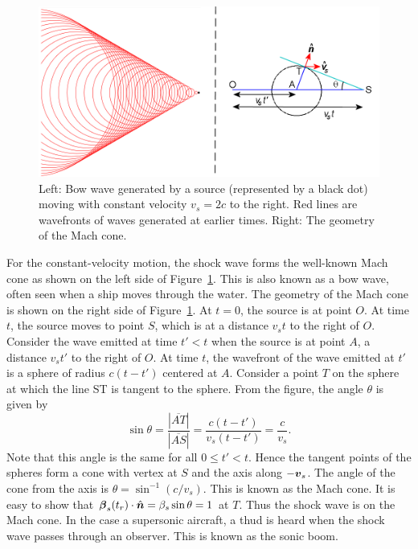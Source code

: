 \documentclass[12pt]{article}
\newcommand \beq {\begin{equation}}
\newcommand \eeq {\end{equation}}
\newcommand{\ve}[1]{\mbox{\boldmath $#1$}}
\begin{document}
\begin{figure}[h]
\includegraphics[width=14cm]{MachCone.png}
\caption{Left: Bow wave generated by a source (represented by a black dot) 
moving with constant velocity $v_s=2c$ to the right. Red lines are wavefronts 
of waves generated at earlier times. Right: The geometry of the Mach cone.}
\label{fig:bow_wave}
\end{figure}

For the constant-velocity motion, the shock wave forms the well-known Mach cone 
as shown on the left side of Figure~\ref{fig:bow_wave}. 
This is also known as a bow wave, often seen when a ship moves through 
the water. The geometry of the Mach cone is shown on the right side of Figure~\ref{fig:bow_wave}. 
At $t=0$, the source is at point $O$. At time $t$, the source moves to point $S$, which 
is at a distance $v_s t$ to the right of $O$. Consider the wave emitted at time $t'<t$ when 
the source is at point $A$, a distance $v_s t'$ to the right of $O$. At time $t$, the 
wavefront of the wave emitted at $t'$ is a sphere of radius $c(t-t')$ centered 
at $A$. Consider a point $T$ on the sphere at which the line ST is tangent to the 
sphere. From the figure, the angle $\theta$ is given by 
\beq
  \sin \theta = \frac{|\overline{AT}|}{|\overline{AS}|} = \frac{c(t-t')}{v_s(t-t')} 
 = \frac{c}{v_s} .
\eeq
Note that this angle is the same for all $0 \leq t' < t$. Hence the tangent points of the 
spheres form a cone with vertex at $S$ and the axis along $-\ve{v}_s$. The angle 
of the cone from the axis is $\theta = \sin^{-1}(c/v_s)$. This is known as the Mach cone.
It is easy to show that 
$\ve{\beta}_s(t_r) \cdot \hat{\ve{n}}=\beta_s \sin \theta = 1$ at $T$. Thus the 
shock wave is on the Mach cone. In the case a supersonic aircraft, 
a thud is heard when the shock wave passes through an observer. This is known as the 
sonic boom. 
\end{document}
